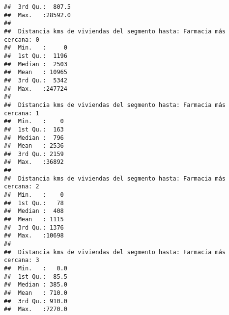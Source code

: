 \documentclass[11pt,]{article}
\begin{document}
\begin{verbatim}
##  3rd Qu.:  807.5                                                                          
##  Max.   :28592.0                                                                          
##                                                                                           
##  Distancia kms de viviendas del segmento hasta: Farmacia más cercana: 0
##  Min.   :     0                                                        
##  1st Qu.:  1196                                                        
##  Median :  2503                                                        
##  Mean   : 10965                                                        
##  3rd Qu.:  5342                                                        
##  Max.   :247724                                                        
##                                                                        
##  Distancia kms de viviendas del segmento hasta: Farmacia más cercana: 1
##  Min.   :    0                                                         
##  1st Qu.:  163                                                         
##  Median :  796                                                         
##  Mean   : 2536                                                         
##  3rd Qu.: 2159                                                         
##  Max.   :36892                                                         
##                                                                        
##  Distancia kms de viviendas del segmento hasta: Farmacia más cercana: 2
##  Min.   :    0                                                         
##  1st Qu.:   78                                                         
##  Median :  408                                                         
##  Mean   : 1115                                                         
##  3rd Qu.: 1376                                                         
##  Max.   :10698                                                         
##                                                                        
##  Distancia kms de viviendas del segmento hasta: Farmacia más cercana: 3
##  Min.   :   0.0                                                        
##  1st Qu.:  85.5                                                        
##  Median : 385.0                                                        
##  Mean   : 710.0                                                        
##  3rd Qu.: 910.0                                                        
##  Max.   :7270.0                                                        

\end{verbatim}
\end{document}
